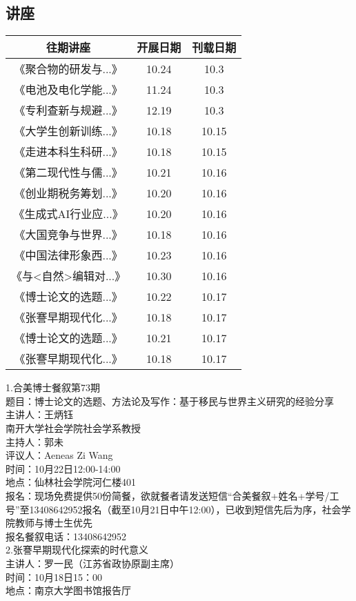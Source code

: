 \documentclass[letterpaper, 12pt]{article}
\begin{document}
\begin{multicols}{2}

\section{讲座}
\begin{tabular}{|c|c|c|}
    \hline
    往期讲座 & 开展日期 & 刊载日期\\
    \hline\hline
    《聚合物的研发与...》 & 10.24 & 10.3\\
    《电池及电化学能...》 & 11.24 & 10.3\\
    《专利查新与规避...》 & 12.19 & 10.3\\
    《大学生创新训练...》 & 10.18 & 10.15\\
    《走进本科生科研...》 & 10.18 & 10.15\\
    《第二现代性与儒...》& 10.21 &10.16\\
    《创业期税务筹划...》 & 10.20 & 10.16\\
    《生成式AI行业应...》 & 10.20 & 10.16\\
    《大国竞争与世界...》 & 10.18 & 10.16\\
    《中国法律形象西...》 & 10.23 & 10.16\\
    《与<自然>编辑对...》 & 10.30 & 10.16\\
    《博士论文的选题...》 & 10.22 & 10.17\\
    《张謇早期现代化...》 & 10.18 & 10.17\\
    《博士论文的选题...》 & 10.21 & 10.17\\
    《张謇早期现代化...》 & 10.18 & 10.17\\
    
    \hline
\end{tabular}

1.合美博士餐叙第73期
\\题目：博士论文的选题、方法论及写作：基于移民与世界主义研究的经验分享
\\主讲人：王炳钰
\\南开大学社会学院社会学系教授
\\主持人：郭未
\\评议人：Aeneas Zi Wang
\\时间：10月22日12:00-14:00
\\地点：仙林社会学院河仁楼401
\\报名：现场免费提供50份简餐，欲就餐者请发送短信“合美餐叙+姓名+学号/工号”至13408642952报名（截至10月21日中午12:00），已收到短信先后为序，社会学院教师与博士生优先
\\报名餐叙电话：13408642952\\
2.张謇早期现代化探索的时代意义\\
主讲人：罗一民（江苏省政协原副主席）\\
时间：10月18日15：00\\
地点：南京大学图书馆报告厅\\\\


\end{multicols}
\end{document}
